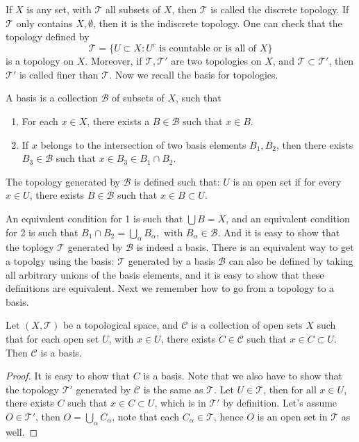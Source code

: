 If $X$ is any set, with $\mathcal{T}$ all subsets of $X$, then $\mathcal{T}$ is called the discrete topology. If $\mathcal{T}$ only contains $X, \emptyset$, then it is the indiscrete topology. One can check that the topology defined by 
\begin{equation*}
    \mathcal{T}=\{ U\subset X: U^c \text{ is countable or is all of $X$} \}
\end{equation*}
is a topology on $X$. Moreover, if $\mathcal{T}, \mathcal{T}'$ are two topologies on $X$, and $\mathcal{T}\subset\mathcal{T}'$, then $\mathcal{T}'$ is called finer than $\mathcal{T}$. Now we recall the basis for topologies.
\begin{defn}[basis]
    A basis is a collection $\mathcal{B}$ of subsets of $X$, such that 
    \begin{enumerate}
        \item For each $x\in X$, there exists a $B\in\mathcal{B}$ such that $x\in B$.
        \item If $x$ belongs to the intersection of two basis elements $B_1, B_2$, then there exists $B_3\in\mathcal{B}$ such that $x\in B_3\in B_1\cap B_2$. 
    \end{enumerate}
    The topology generated by $\mathcal{B}$ is defined such that: $U$ is an open set if for every $x\in U$, there exists $B\in\mathcal{B}$ such that $x\in B\subset U$.
\end{defn}
An equivalent condition for 1 is such that $\bigcup B=X$, and an equivalent condition for 2 is such that $B_1\cap B_2=\bigcup_{\alpha} B_\alpha, \text{ with } B_\alpha\in\mathcal{B}$. And it is easy to show that the toplogy $\mathcal{T}$ generated by $\mathcal{B}$ is indeed a basis. There is an equivalent way to get a topolgy using the basis: $\mathcal{T}$ generated by a basis $\mathcal{B}$ can also be defined by taking all arbitrary unions of the basis elements, and it is easy to show that these definitions are equivalent. Next we remember how to go from a topology to a basis.
\begin{lem}
Let $(X,\mathcal{T})$ be a topological space, and $\mathcal{C}$ is a collection of open sets $X$ such that for each open set $U$, with $x\in U$, there exists $C\in\mathcal{C}$ such that $x\in C\subset U$. Then $\mathcal{C}$ is a basis.
\end{lem}
\begin{proof}
    It is easy to show that $C$ is a basis. Note that we also have to show that the topology $\mathcal{T}'$ generated by $\mathcal{C}$ is the same as $\mathcal{T}$. Let $U\in\mathcal{T}$, then for all $x\in U$, there exists $C$ such that $x\in C\subset U$, which is in $\mathcal{T}'$ by definition. Let's assume $O\in\mathcal{T}'$, then $O=\bigcup_\alpha C_\alpha$, note that each $C_\alpha\in\mathcal{T}$, hence $O$ is an open set in $\mathcal{T}$ as well.
\end{proof}
